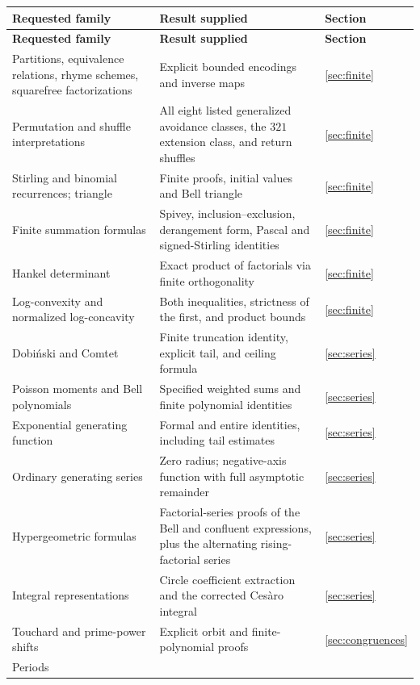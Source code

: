 \documentclass[11pt]{article}
\theoremstyle{definition}
\theoremstyle{remark}
\numberwithin{equation}{section}
\begin{document}
\small
\begin{longtable}{@{}>{\raggedright\arraybackslash}p{}>{\raggedright\arraybackslash}p{}p{}@{}}
\toprule
\textbf{Requested family} & \textbf{Result supplied} & \textbf{Section}\\
\midrule
\endfirsthead
\toprule
\textbf{Requested family} & \textbf{Result supplied} & \textbf{Section}\\
\midrule
\endhead
Partitions, equivalence relations, rhyme schemes, squarefree factorizations &
Explicit bounded encodings and inverse maps & \ref{sec:finite}\\
Permutation and shuffle interpretations &
All eight listed generalized avoidance classes, the $321$ extension class,
and return shuffles & \ref{sec:finite}\\
Stirling and binomial recurrences; triangle &
Finite proofs, initial values and Bell triangle & \ref{sec:finite}\\
Finite summation formulas &
Spivey, inclusion--exclusion, derangement form, Pascal and signed-Stirling
identities & \ref{sec:finite}\\
Hankel determinant &
Exact product of factorials via finite orthogonality & \ref{sec:finite}\\
Log-convexity and normalized log-concavity &
Both inequalities, strictness of the first, and product bounds & \ref{sec:finite}\\
Dobi\'nski and Comtet &
Finite truncation identity, explicit tail, and ceiling formula & \ref{sec:series}\\
Poisson moments and Bell polynomials &
Specified weighted sums and finite polynomial identities & \ref{sec:series}\\
Exponential generating function &
Formal and entire identities, including tail estimates & \ref{sec:series}\\
Ordinary generating series &
Zero radius; negative-axis function with full asymptotic remainder & \ref{sec:series}\\
Hypergeometric formulas &
Factorial-series proofs of the Bell and confluent expressions, plus the
alternating rising-factorial series & \ref{sec:series}\\
Integral representations &
Circle coefficient extraction and the corrected Ces\`aro integral & \ref{sec:series}\\
Touchard and prime-power shifts &
Explicit orbit and finite-polynomial proofs & \ref{sec:congruences}\\
Periods &

\end{longtable}
\end{document}
